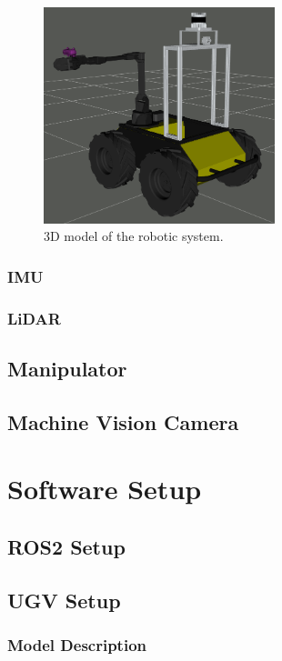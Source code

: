 \begin{figure}[H]
  \centering
  \includegraphics[width = 0.6\textwidth]{Figures/husky_initiated.png}
  \caption{3D model of the robotic system.}
  \label{fig:hardware}
\end{figure}

\subsubsection{IMU}

\subsubsection{LiDAR}

\subsection{Manipulator}

\subsection{Machine Vision Camera}

\section{Software Setup}

\subsection{ROS2 Setup}

\subsection{UGV Setup}
\subsubsection{Model Description}

